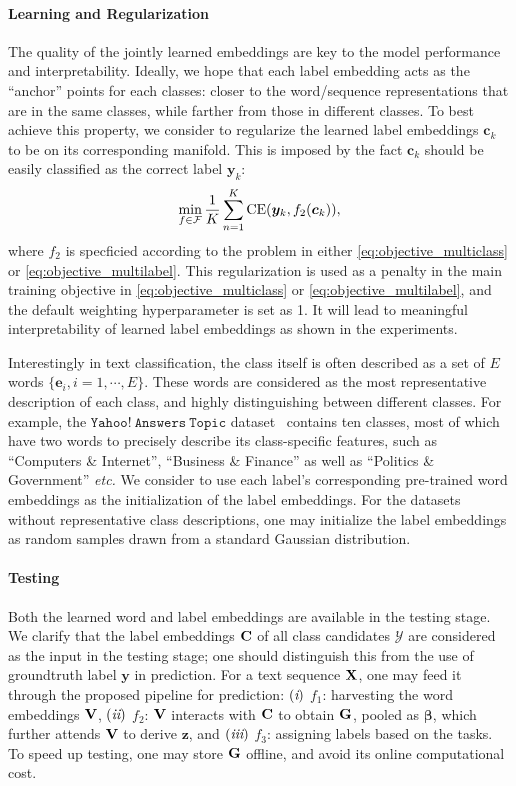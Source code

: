 \documentclass[11pt,a4paper]{article}
\newcommand{\etc}[0]{\emph{etc. }}
\newcommand{\beq}{\vspace{0mm}\begin{equation}}
\newcommand{\eeq}{\vspace{0mm}\end{equation}}
\newcommand{\Cmat}{{\bf C}}
\newcommand{\Gmat}{{\bf G}}
\newcommand{\Vmat}[0]{{{\bf V}}}
\newcommand{\Xmat}[0]{{{\bf X}}}
\newcommand{\cv}[0]{{\boldsymbol{c}}}
\newcommand{\ev}[0]{{\boldsymbol{e}}\xspace}
\newcommand{\yv}{\boldsymbol{y}}
\newcommand{\zv}{\boldsymbol{z}}
\newcommand{\betav}[0]{{\boldsymbol{\beta}}}
\newcommand{\Ycal}{\mathcal{Y}}
\newcommand{\Fcal}{\mathcal{F}}
\newcommand{\RN}[1]{\textup{\lowercase\expandafter{\it \romannumeral#1}}}
\begin{document}
\paragraph{Learning and Regularization}
The quality of the jointly learned embeddings are key to the model performance and interpretability. Ideally, we hope that each label embedding acts as the ``anchor'' points for each classes: closer to the word/sequence representations that are in the same classes, while farther from those in different classes. 
To best achieve this property, we consider to regularize the learned label embeddings $\cv_k$ to be on its corresponding manifold. This is imposed by the fact $\cv_k$ should be easily classified as the correct label $\yv_k$:
\beq
\min_{f \in \Fcal} \frac{1}{K} \sum_{n=1}^{K}
\mbox{CE} (\yv_{k}, f_2(\cv_{k}) ),
\label{eq:objective_label}
\eeq
where $f_2$ is specficied according to the problem in either \eqref{eq:objective_multiclass} or \eqref{eq:objective_multilabel}.
This regularization is used as a penalty in the main training objective in \eqref{eq:objective_multiclass} or \eqref{eq:objective_multilabel}, and the default weighting hyperparameter is set as 1. It will lead to meaningful interpretability of learned label embeddings as shown in the experiments.





Interestingly in text classification, the class itself is often described as a set of $E$ words $\{\ev_i, i=1, \cdots, E\}$. 
These words are considered as the most representative description of each class, and highly distinguishing between different classes.
For example, the $\mathtt{Yahoo!~Answers~Topic}$ dataset~\cite{zhang2015character} contains ten classes, most of which have two words to precisely describe its class-specific features, such as ``Computers \& Internet'', ``Business \& Finance'' as well as ``Politics \& Government'' \etc 
We consider to use each label's corresponding pre-trained word embeddings as the initialization of the label embeddings.  
For the datasets without representative class descriptions, one may initialize the label embeddings as random samples drawn from a standard Gaussian distribution.

\paragraph{Testing}
Both the learned word and label embeddings are available in the testing stage.
We clarify that the label embeddings $\Cmat$ of all class candidates $\Ycal$ are considered as the input in the testing stage; one should distinguish this from the use of groundtruth label $\yv$ in prediction.
For a text sequence $\Xmat$, one may feed it through the proposed pipeline for prediction: 
$(\RN{1})$ $f_1$: harvesting the word embeddings $\Vmat$, 
$(\RN{2})$ $f_2$: $\Vmat$ interacts with $\Cmat$ to obtain $\Gmat$, pooled as $\betav$, which further attends $\Vmat$ to derive $\zv$, and
$(\RN{3})$ $f_3$: assigning labels based on the tasks. To speed up testing, one may store $\Gmat$ offline, and avoid its online computational cost.
\end{document}
